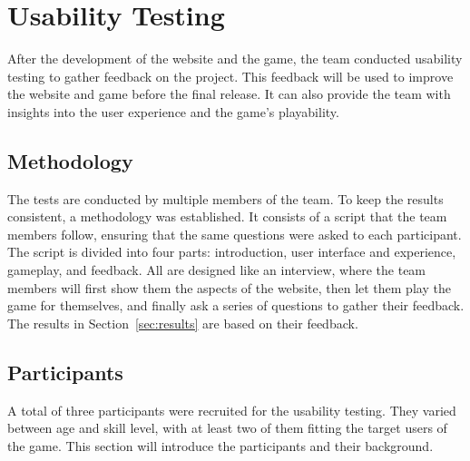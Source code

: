 \chapter{Usability Testing}\label{ch:user-test}

After the development of the website and the game,
the team conducted usability testing to gather feedback on the project.
This feedback will be used to improve the website and game before the final release.
It can also provide the team with insights into the user experience and the game's playability.

\section{Methodology}\label{sec:methodology}

The tests are conducted by multiple members of the team.
To keep the results consistent, a methodology was established.
It consists of a script that the team members follow, ensuring that the same questions were asked to each participant.
The script is divided into four parts: introduction, user interface and experience, gameplay, and feedback.
All are designed like an interview, where the team members will first show them the aspects of the website,
then let them play the game for themselves, and finally ask a series of questions to gather their feedback.
The results in Section~\ref{sec:results} are based on their feedback.

\section{Participants}\label{sec:participants}

A total of three participants were recruited for the usability testing.
They varied between age and skill level, with at least two of them fitting the target users of the game.
This section will introduce the participants and their background.

